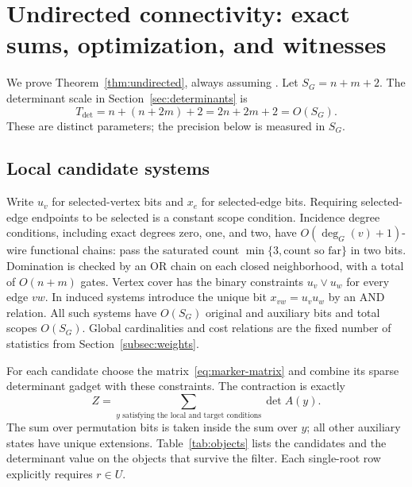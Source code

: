 \section{Undirected connectivity: exact sums, optimization, and witnesses}
\label{sec:undirected-proof}

We prove Theorem~\ref{thm:undirected}, always assuming \HTC.
Let $S_G=n+m+2$. The determinant scale in
Section~\ref{sec:determinants} is
\[
 T_{\mathrm{det}}=n+(n+2m)+2=2n+2m+2=O(S_G).
\]
These are distinct parameters; the precision below is measured in
$S_G$.

\subsection{Local candidate systems}

Write $u_v$ for selected-vertex bits and $x_e$ for selected-edge
bits. Requiring selected-edge endpoints to be selected is a constant
scope condition. Incidence degree conditions, including exact degrees
zero, one, and two, have $O(\deg_G(v)+1)$-wire functional chains:
pass the saturated count $\min\{3,\text{count so far}\}$ in two
bits. Domination is checked by an OR chain on each closed neighborhood,
with a total of $O(n+m)$ gates. Vertex cover has the binary constraints
$u_v\vee u_w$ for every edge $vw$. In induced systems introduce the
unique bit $x_{vw}=u_vu_w$ by an AND relation. All such systems have
$O(S_G)$ original and auxiliary bits and total scopes $O(S_G)$.
Global cardinalities and cost relations are the fixed number of
statistics from Section~\ref{subsec:weights}.

For each candidate choose the matrix~\eqref{eq:marker-matrix} and
combine its sparse determinant gadget with these constraints. The
contraction is exactly
\begin{equation}\label{eq:object-sum}
 Z=\sum_{y\text{ satisfying the local and target conditions}}\det A(y).
\end{equation}
The sum over permutation bits is taken inside the sum over $y$; all
other auxiliary states have unique extensions. Table~\ref{tab:objects}
lists the candidates and the determinant value on the objects that
survive the filter. Each single-root row explicitly requires $r\in U$.

